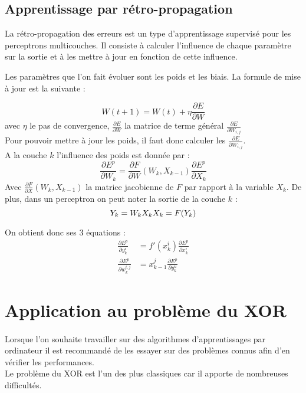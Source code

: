 



\subsection{Apprentissage par rétro-propagation}


La rétro-propagation des erreurs est un type d’apprentissage supervisé pour les perceptrons multicouches. Il consiste à calculer l’influence de chaque paramètre sur la sortie et à les mettre à jour en fonction de cette influence.

Les paramètres que l’on fait évoluer sont les poids et les biais.
La formule de mise à jour est la suivante :

\[
W(t+1) = W(t) + \eta \frac{\partial E}{\partial W} 
\]
avec $\eta$ le pas de convergence, $\frac{\partial E}{\partial W} $ la matrice de terme général $\frac{\partial E}{\partial W_{i,j}} $\\
Pour pouvoir mettre à jour les poids, il faut donc calculer les $\frac{\partial E}{\partial W_{i,j}} $.\\
A la couche $k$ l'influence des poids est donnée par : 
\[
	\frac{\partial E^p}{\partial W _k} = \frac{\partial F}{\partial W}(W_k, X_{k-1})\frac{\partial E^p}{\partial X_k}
\]
Avec $\frac{\partial F}{\partial X }(W_k, X_{k-1})$ la matrice jacobienne de $F$ par rapport à la variable $X_k$. De plus, dans un perceptron on peut noter la sortie de la couche $k$ : 
\[
Y_k = W_k X_k \\
X_k = F(Y_k)
\]

On obtient donc ses 3 équations : 
\begin{align*}
\frac{\partial E^p}{\partial y_k^i} &= f'(x_k^i)\frac{\partial E^p}{\partial x_k^i} \\
\frac{\partial E^p}{\partial w_k^{i,j}}&= x^j_{k-1} \frac{\partial E^p}{\partial y_k^u}
\end{align*}
\section{Application au problème du XOR}

\paragraph*{}
Lorsque l'on souhaite travailler sur des algorithmes d'apprentissages par ordinateur il est recommandé de les essayer sur des problèmes connus afin d'en vérifier les performances. \\
Le problème du XOR est l'un des plus classiques car il apporte de nombreuses difficultés.\\

